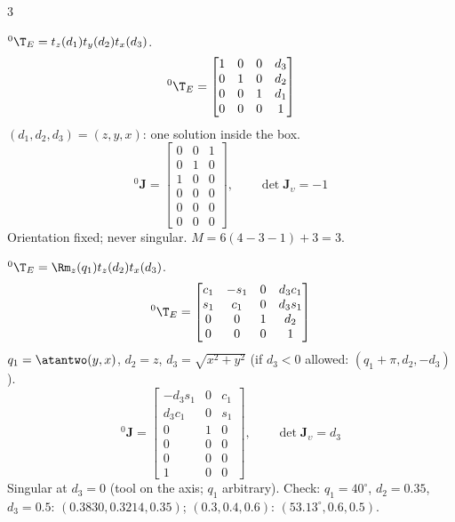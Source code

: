\begin{multicols}{3}
\begin{fbx}
${}^0\T_E=t_z(d_1)t_y(d_2)t_x(d_3)$.
{\rbsm\[{}^0\T_E=\begin{bmatrix}1&0&0&d_3\\0&1&0&d_2\\0&0&1&d_1\\0&0&0&1\end{bmatrix}\]}
$(d_1,d_2,d_3)=(z,y,x)$: one solution inside the box.
{\rbsm\[{}^0\mathbf J=\begin{bmatrix}0&0&1\\0&1&0\\1&0&0\\0&0&0\\0&0&0\\0&0&0\end{bmatrix},\qquad\det\mathbf J_\upsilon=-1\]}
Orientation fixed; never singular. $M=6(4-3-1)+3=3$. \chk
\end{fbx}

\begin{fbx}
${}^0\T_E=\Rm_z(q_1)t_z(d_2)t_x(d_3)$.
{\rbsm\[{}^0\T_E=\begin{bmatrix}c_1&-s_1&0&d_3c_1\\s_1&c_1&0&d_3s_1\\0&0&1&d_2\\0&0&0&1\end{bmatrix}\]}
$q_1=\atantwo(y,x)$, $d_2=z$, $d_3=\sqrt{x^2+y^2}$ (if $d_3<0$ allowed: $(q_1{+}\pi,d_2,-d_3)$).
{\rbsm\[{}^0\mathbf J=\begin{bmatrix}-d_3s_1&0&c_1\\d_3c_1&0&s_1\\0&1&0\\0&0&0\\0&0&0\\1&0&0\end{bmatrix},\qquad\det\mathbf J_\upsilon=d_3\]}
Singular at $d_3=0$ (tool on the axis; $q_1$ arbitrary). Check: $q_1=40^\circ$, $d_2=0.35$, $d_3=0.5$: $(0.3830,0.3214,0.35)$; $(0.3,0.4,0.6)$: $(53.13^\circ,0.6,0.5)$. \chk
\end{fbx}


\end{multicols}
